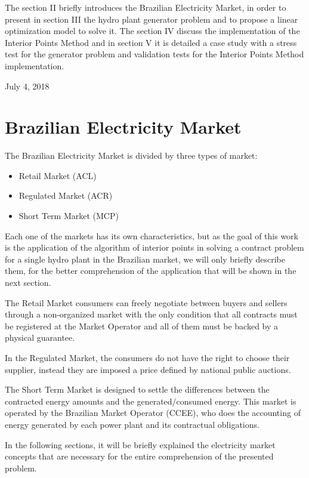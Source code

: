 \documentclass[a4paper]{IEEEtran}
\begin{document}
The section II briefly introduces the Brazilian Electricity Market, in order to present in section III the hydro plant generator problem and to propose a linear optimization model to solve it. The section IV discuss the implementation of the Interior Points Method and in section V it is detailed a case study with a stress test for the generator problem and validation tests for the Interior Points Method implementation.


 
\hfill July 4, 2018

\section{Brazilian Electricity Market}
The Brazilian Electricity Market is divided by three types of market: 

\begin{itemize}
	\item Retail Market (ACL)
	\item Regulated Market (ACR)
	\item Short Term Market (MCP) 
\end{itemize}

Each one of the markets has its own characteristics, but as the goal of this work is the application of the algorithm of interior points in solving a contract problem for a single hydro plant in the Brazilian market, we will only briefly describe them, for the better comprehension of the application that will be shown in the next section. 

The Retail Market consumers can freely negotiate between buyers and sellers through a non-organized market with the only condition that all contracts must be registered at the Market Operator and all of them must be backed by a physical guarantee.

In the Regulated Market, the consumers do not have the right to choose their supplier, instead they are imposed a price defined by national public auctions.

The Short Term Market is designed to settle the differences between the contracted energy amounts and the generated/consumed energy. This market is operated by the Brazilian Market Operator (CCEE), who does the accounting of energy generated by each power plant and its contractual obligations.


In the following sections, it will be briefly explained the electricity market concepts that are necessary for the entire comprehension of the presented problem.
\end{document}
